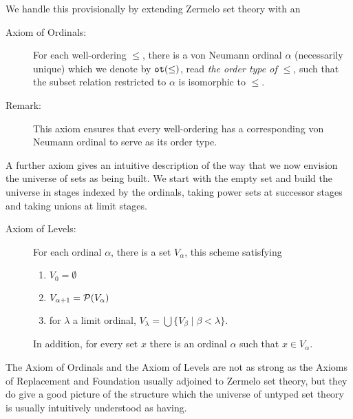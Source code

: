 \documentclass[12pt]{book}
\begin{document}
We handle this provisionally by extending Zermelo set theory with an

\begin{description}

\item[Axiom of Ordinals:]  For each well-ordering $\leq$, there is a von Neumann ordinal $\alpha$ (necessarily unique) which we denote
by ${\tt ot}(\leq)$, read {\em the order type of $\leq$\/}, such that the subset relation restricted to $\alpha$ is isomorphic to $\leq$.

\item[Remark:]  This axiom ensures that every well-ordering has a corresponding von Neumann ordinal to serve as its order type.

\end{description}

A further axiom gives an intuitive description of the way that we now envision the universe of sets as being built.  We start with the empty set and build the universe in stages indexed by the ordinals, taking power sets at successor stages and taking unions at limit stages.

\begin{description}

\item[Axiom of Levels:]  For each ordinal $\alpha$, there is a set $V_{\alpha}$, this scheme satisfying

\begin{enumerate}

\item $V_0 = \emptyset$

\item $V_{\alpha+1} = {\cal P}(V_{\alpha})$

\item for $\lambda$ a limit ordinal, $V_{\lambda}= \bigcup \{V_{\beta}\mid \beta<\lambda\}$.

\end{enumerate}

In addition, for every set $x$ there is an ordinal $\alpha$ such that $x \in V_{\alpha}$.

\end{description}

The Axiom of Ordinals and the Axiom of Levels are not as strong as the Axioms of Replacement and Foundation usually adjoined to Zermelo set theory,
but they do give a good picture of the structure which the universe of untyped set theory is usually intuitively understood as having.
\end{document}
